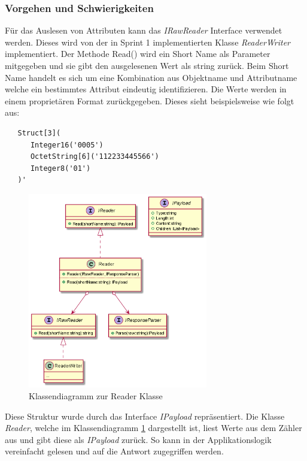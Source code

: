 \subsubsection{Vorgehen und Schwierigkeiten}
Für das Auslesen von Attributen kann das \textit{IRawReader} Interface verwendet werden.
Dieses wird von der in Sprint 1 implementierten Klasse \textit{ReaderWriter} implementiert.
Der Methode Read() wird ein Short Name als Parameter mitgegeben und sie gibt den ausgelesenen Wert als string zurück.
Beim Short Name handelt es sich um eine Kombination aus Objektname und Attributname welche ein bestimmtes Attribut eindeutig identifizieren.
Die Werte werden in einem proprietären Format zurückgegeben. 
Dieses sieht beispielsweise wie folgt aus:
\begin{verbatim}
   Struct[3](
      Integer16('0005')
      OctetString[6]('112233445566')
      Integer8('01')
   )'
\end{verbatim}
\begin{figure}
\centering
\includegraphics[width=0.7\textwidth]{gfx/string_toPayload.png}
\caption{
   Klassendiagramm zur Reader Klasse
   }
   \label{fig:reader}
\end{figure}
Diese Struktur wurde durch das Interface \textit{IPayload} repräsentiert.
Die Klasse \textit{Reader}, welche im Klassendiagramm \ref{fig:reader} dargestellt ist, liest Werte aus dem Zähler aus und gibt diese als \textit{IPayload} zurück.
So kann in der Applikationslogik vereinfacht gelesen und auf die Antwort zugegriffen werden.

